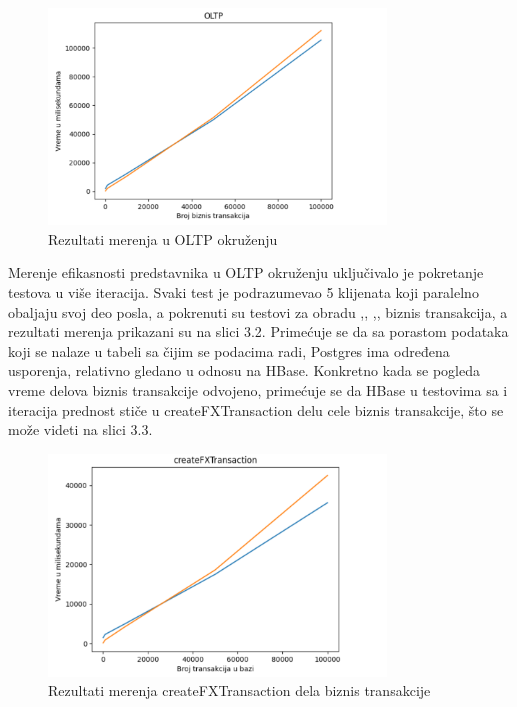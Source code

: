\documentclass[12pt,oneside]{memoir}
\begin{document}
\begin{figure}[!ht]
  \centering
  \includegraphics[width=0.8\textwidth]{oltp-vizualization.png}
  \caption{Rezultati merenja u OLTP okruženju}
  \label{fig:grafikon}
\end{figure}

Merenje efikasnosti predstavnika u OLTP okruženju uključivalo je pokretanje testova u više iteracija. Svaki test je podrazumevao 5 klijenata koji paralelno obaljaju svoj deo posla, a pokrenuti su testovi za obradu ,, ,, biznis transakcija, a rezultati merenja prikazani su na slici 3.2. Primećuje se da sa porastom podataka koji se nalaze u tabeli sa čijim se podacima radi, Postgres ima određena usporenja, relativno gledano u odnosu na HBase. Konkretno kada se pogleda vreme delova biznis transakcije odvojeno, primećuje se da HBase u testovima sa  i  iteracija prednost stiče u createFXTransaction delu cele biznis transakcije, što se može videti na slici 3.3. 

\begin{figure}[!ht]
  \centering
  \includegraphics[width=0.8\textwidth]{createFxTransaction-vizualization.png}
  \caption{Rezultati merenja createFXTransaction dela biznis transakcije}
  \label{fig:grafikon}
\end{figure}
\end{document}
